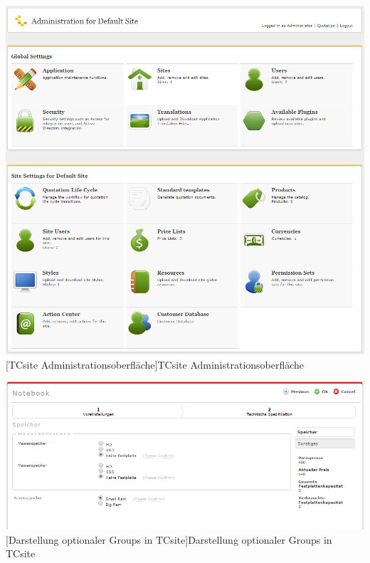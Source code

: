\begin{appendix}
\vspace{1em}
\begin{minipage}{\linewidth}
	\centering
	\includegraphics[width=1\linewidth]{Abbildungen/tcsiteAdministration.PNG}
	[TCsite Administrationsoberfläche]{TCsite Administrationsoberfläche}
	\label{app:tcsiteAdministration}
\end{minipage}
\vspace{1em}

\vspace{1em}
\begin{minipage}{\linewidth}
	\centering
	\includegraphics[width=1\linewidth]{Abbildungen/tcSiteConfigurationOptionalGroups.PNG}
	[Darstellung optionaler Groups in TCsite]{Darstellung optionaler Groups in TCsite}
	\label{app:tcSiteConfigurationOptionalGroups}
\end{minipage}
\vspace{1em}


\end{appendix}
